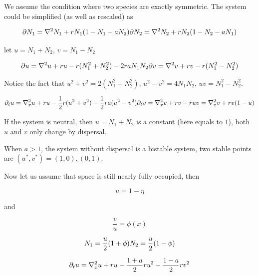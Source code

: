 \documentclass[
]{article}
\begin{document}
We assume the condition where two species are exactly symmetric. The
system could be simplified (as well as rescaled) as

\begin{equation*}
\partial N_{1} = \nabla^2 N_1 + r N_1(1 - N_1 - a N_2)\\
\partial N_{2} = \nabla^2 N_2 + r N_2(1 - N_2 - a N_1)
\end{equation*}

let $u = N_1+N_2$, $v=N_1-N_2$

\begin{equation*}
\partial u = \nabla^2 u + r u - r (N_1^2 + N_2^2) - 2 r a N_1 N_2\\
\partial v = \nabla^2 v + r v - r (N_1^2 - N_2^2)\\
\end{equation*}

Notice the fact that $u^2 + v^2 = 2(N_1^2 + N_2^2)$,
$u^2- v^2 = 4 N_1N_2$, $uv = N_1^2 - N_2^2$.

\begin{equation*}
\partial_t u = \nabla^2_x u + r u - \frac{1}{2} r (u^2 + v^2) - \frac{1}{2} r a (u^2-v^2)\\
\partial_t v = \nabla^2_x v + r v - r u v = \nabla^2_x v + r v ( 1 - u)
\end{equation*}

If the system is neutral, then $u = N_{1}+N_{2}$ is a constant (here
equals to $1$), both $u$ and $v$ only change by dispersal.

When $a>1$, the system without dispersal is a bistable system, two
stable points are $(u^*,v^*) = (1,0),(0,1)$.

Now let us assume that space is still nearly fully occupied, then

\begin{equation*}
u = 1 - \eta
\end{equation*}

and

\begin{equation*}
\frac{v}{u} = \phi(x)
\end{equation*}

\begin{equation*}
N_{1} = \frac{u}{2} (1+\phi)\\
N_{2} = \frac{u}{2} (1- \phi)
\end{equation*}

\begin{equation*}
\partial_t u = \nabla^2_x u + r u - \frac{1+a}{2} r u^2 - \frac{1-a}{2} r v^2\\
\end{equation*}
\end{document}
